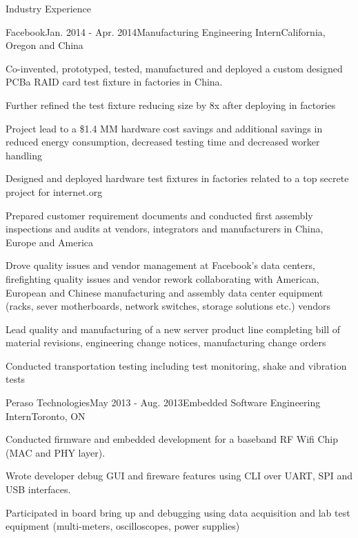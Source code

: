 \documentclass{resume} %
\begin{document}
\begin{rSection}{Industry Experience}
\begin{rSubsection}{Facebook}{Jan. 2014 - Apr. 2014}{Manufacturing Engineering Intern}{California, Oregon and China}
\item Co-invented, prototyped, tested, manufactured and deployed a custom designed PCBa RAID card test fixture in factories in China.
\item Further refined the test fixture reducing size by 8x after deploying in factories
\item Project lead to a \$1.4 MM hardware cost savings and additional savings in reduced energy consumption, decreased testing time and decreased worker handling
\item Designed and deployed hardware test fixtures in factories related to a top secrete project for internet.org
\item Prepared customer requirement documents and conducted first assembly inspections and audits at vendors, integrators and manufacturers in China, Europe and America
\item Drove quality issues and vendor management at Facebook's data centers, firefighting quality issues and vendor rework collaborating with American, European and Chinese manufacturing and assembly  data center equipment (racks, sever motherboards, network switches, storage solutions etc.) vendors
\item Lead quality and manufacturing of a new server product line completing bill of material revisions, engineering change notices, manufacturing change orders
\item Conducted transportation testing including test monitoring, shake and vibration tests
\end{rSubsection}

\begin{rSubsection}{Peraso Technologies}{May 2013 - Aug. 2013}{Embedded Software Engineering Intern}{Toronto, ON}
\item Conducted firmware and embedded development for a baseband RF Wifi Chip (MAC and PHY layer).
\item Wrote developer debug GUI and fireware features using CLI over UART, SPI and USB interfaces. 
\item Participated in board bring up and debugging using data acquisition and lab test equipment (multi-meters, oscilloscopes, power supplies)

\end{rSubsection}



\end{rSection}
\end{document}
